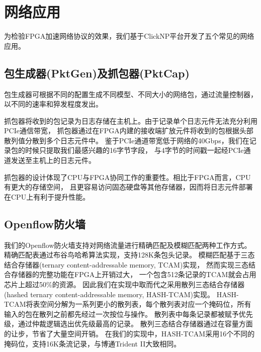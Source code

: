 \chapter{网络应用}
为检验FPGA加速网络协议的效果，我们基于ClickNP平台开发了五个常见的网络应用。

\section{包生成器(PktGen)及抓包器(PktCap)}
包生成器可根据不同的配置生成不同模型、不同大小的网络包，通过流量控制器，以不同的速率和猝发程度发出。

抓包器将收到的包记录为日志存储在主机上。由于记录单个日志元件无法充分利用PCIe通信带宽，
抓包器通过在FPGA内建的接收端扩放元件将收到的包根据头部散列值分散到多个日志元件中。
鉴于PCIe通道带宽低于网络的40Gbps，我们在记录包的时候只提取我们最感兴趣的16字节字段，
与4字节的时间戳一起经PCIe通道发送至主机上的日志元件。

抓包器的设计体现了CPU与FPGA协同工作的重要性。相比于FPGA而言，CPU有更大的存储空间，
且更容易访问固态硬盘等其他存储器，因而将日志元件部署在CPU上有利于提升性能。

\section{Openflow防火墙}
我们的Openflow防火墙支持对网络流量进行精确匹配及模糊匹配两种工作方式。
精确匹配表通过布谷鸟哈希算法实现，支持128K条包头记录。
模糊匹配基于三态结合存储器(ternary content-addressable memory, TCAM)实现，
然而实现三态结合存储器的完整功能在FPGA上开销过大，
一个包含512条记录的TCAM就会占用芯片上超过50\%的资源。
因此我们在实现中取而代之采用散列三态结合存储器(hashed ternary content-addressable memory, HASH-TCAM)实现。
HASH-TCAM将表空间分解为一系列更小的散列表，每个散列表对应一个掩码位，所有输入的包在散列之前都先经过一次按位与操作。
散列表中每条记录都被赋予优先级，通过仲裁逻辑选出优先级最高的记录。
散列三态结合存储器通过在容量方面的让步，节省了大量空间开销。
在我们的实现中，HASH-TCAM采用16个不同的掩码位，支持16K条流记录，与博通Trident II大致相同。

